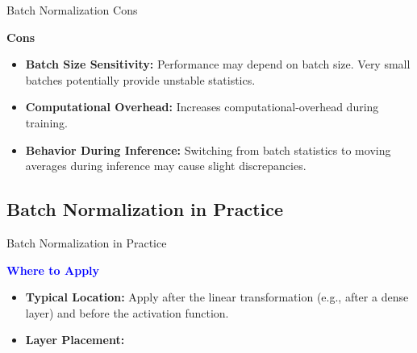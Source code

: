 \documentclass[serif, aspectratio=169]{beamer}
\begin{document}
\begin{frame}{Batch Normalization Cons}

    \textbf{Cons}
    
    \begin{itemize}

        \item \textbf{Batch Size Sensitivity:} Performance may depend on batch size. Very small batches potentially provide unstable statistics.
        \item \textbf{Computational Overhead:} Increases computational-overhead during training.
        \item \textbf{Behavior During Inference:} Switching from batch statistics to moving averages during inference may cause slight discrepancies.

    \end{itemize}
\end{frame}

\subsection{Batch Normalization in Practice}

\begin{frame}{Batch Normalization in Practice}
	
	\textcolor{blue}{\textbf{Where to Apply}}
	
	\begin{itemize}
		\item \textbf{Typical Location:} Apply after the linear transformation (e.g., after a dense layer) and before the activation function.
		\item \textbf{Layer Placement:}
		\newline
		\begin{center}
		\end{center}
	\end{itemize}
	
\end{frame}
\end{document}
